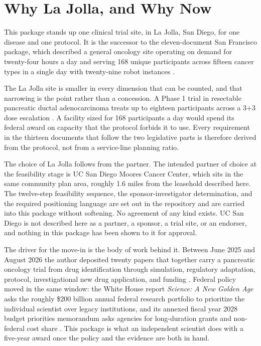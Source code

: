 
\section{Why La Jolla, and Why Now}

This package stands up one clinical trial site, in La Jolla, San Diego, for one
disease and one protocol. It is the successor to the eleven-document San
Francisco package, which described a general oncology site operating on demand
for twenty-four hours a day and serving 168 unique participants across fifteen
cancer types in a single day with twenty-nine robot instances
\cite{sfsite2026,newtrial2026}.

The La Jolla site is smaller in every dimension that can be counted, and that
narrowing is the point rather than a concession. A Phase 1 trial in resectable
pancreatic ductal adenocarcinoma treats up to eighteen participants across a
3+3 dose escalation \cite{phase1protocol}. A facility sized for 168 participants
a day would spend its federal award on capacity that the protocol forbids it to
use. Every requirement in the thirteen documents that follow the two legislative
parts is therefore derived from the protocol, not from a service-line planning
ratio.

The choice of La Jolla follows from the partner. The intended partner of choice
at the feasibility stage is UC San Diego Moores Cancer Center, which sits in the
same community plan area, roughly 1.6 miles from the leasehold described here.
The twelve-step feasibility sequence, the sponsor-investigator determination, and
the required positioning language are set out in the repository and are carried
into this package without softening. No agreement of any kind exists. UC San
Diego is not described here as a partner, a sponsor, a trial site, or an
endorser, and nothing in this package has been shown to it for approval.

The driver for the move-in is the body of work behind it. Between June 2025 and
August 2026 the author deposited twenty papers that together carry a pancreatic
oncology trial from drug identification through simulation, regulatory
adaptation, protocol, investigational new drug application, and funding
\cite{pdacdeck2026}. Federal policy moved in the same window: the White House
report \emph{Science: A New Golden Age} asks the roughly \$200 billion annual
federal research portfolio to prioritize the individual scientist over legacy
institutions, and its annexed fiscal year 2028 budget priorities memorandum asks
agencies for long-duration grants and non-federal cost share
\cite{kratsios2026sciencegoldenage,kratsiosvought2026fy2028priorities}. This
package is what an independent scientist does with a five-year award once the
policy and the evidence are both in hand.

